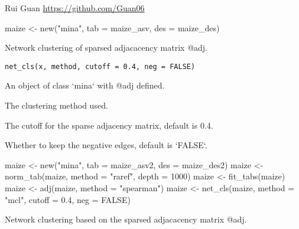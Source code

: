 \documentclass[a4paper]{book}
\begin{document}
%
\begin{Author}\relax
Rui Guan \url{https://github.com/Guan06}
\end{Author}
%
\begin{Examples}
\begin{ExampleCode}
maize <- new("mina", tab = maize_asv, des = maize_des)
\end{ExampleCode}
\end{Examples}
%
\begin{Description}\relax
Network clustering of sparsed adjacacency matrix @adj.
\end{Description}
%
\begin{Usage}
\begin{verbatim}
net_cls(x, method, cutoff = 0.4, neg = FALSE)
\end{verbatim}
\end{Usage}
%
\begin{Arguments}
\begin{ldescription}
\item[\code{x}] An object of class `mina` with @adj defined.

\item[\code{method}] The clustering method used.

\item[\code{cutoff}] The cutoff for the sparse adjacency matrix, default is 0.4.

\item[\code{neg}] Whether to keep the negative edges, default is `FALSE`.
\end{ldescription}
\end{Arguments}
%
\begin{Examples}
\begin{ExampleCode}
maize <- new("mina", tab = maize_asv2, des = maize_des2)
maize <- norm_tab(maize, method = "raref", depth = 1000)
maize <- fit_tabs(maize)
maize <- adj(maize, method = "spearman")
maize <- net_cls(maize, method = "mcl", cutoff = 0.4, neg = FALSE)
\end{ExampleCode}
\end{Examples}
%
\begin{Description}\relax
Network clustering based on the sparsed adjacacency matrix @adj.
\end{Description}
\end{document}

